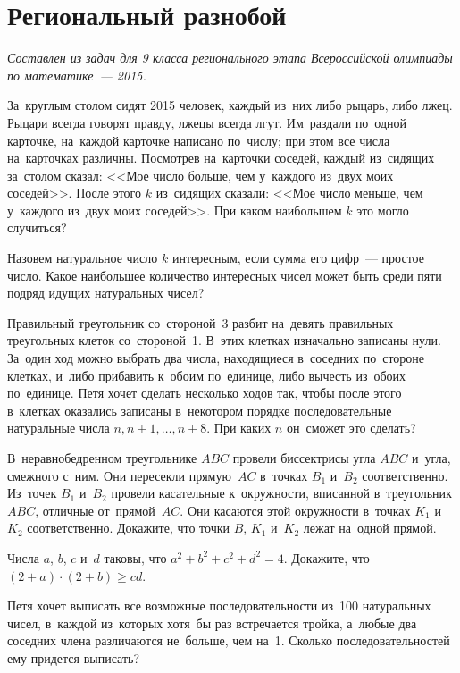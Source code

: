 
\section*{Региональный разнобой}

\emph{Составлен из задач для 9 класса регионального этапа Всероссийской
олимпиады по математике~--- 2015.}

\begin{problems}

\item
За~круглым столом сидят 2015 человек, каждый из~них либо рыцарь, либо лжец.
Рыцари всегда говорят правду, лжецы всегда лгут.
Им~раздали по~одной карточке, на~каждой карточке написано по~числу;
при этом все числа на~карточках различны.
Посмотрев на~карточки соседей, каждый из~сидящих за~столом сказал:
<<Мое число больше, чем у~каждого из~двух моих соседей>>.
После этого $k$ из~сидящих сказали:
<<Мое число меньше, чем у~каждого из~двух моих соседей>>.
При каком наибольшем $k$ это могло случиться?

\item
Назовем натуральное число $k$ интересным, если сумма его цифр~--- простое
число.
Какое наибольшее количество интересных чисел может быть среди пяти подряд
идущих натуральных чисел?

\item
Правильный треугольник со~стороной~3 разбит на~девять правильных треугольных
клеток со~стороной~1.
В~этих клетках изначально записаны нули.
За~один ход можно выбрать два числа, находящиеся в~соседних по~стороне клетках,
и~либо прибавить к~обоим по~единице, либо вычесть из~обоих по~единице.
Петя хочет сделать несколько ходов так, чтобы после этого в~клетках оказались
записаны в~некотором порядке последовательные натуральные числа
$n, n + 1, \ldots, n + 8$.
При каких $n$ он~сможет это сделать?

\item
В~неравнобедренном треугольнике $ABC$ провели биссектрисы угла $ABC$ и~угла,
смежного с~ним.
Они пересекли прямую~$AC$ в~точках $B_1$ и~$B_2$ соответственно.
Из~точек $B_1$ и~$B_2$ провели касательные к~окружности, вписанной
в~треугольник $ABC$, отличные от~прямой~$AC$.
Они касаются этой окружности в~точках $K_1$ и~$K_2$ соответственно.
Докажите, что точки $B$, $K_1$ и~$K_2$ лежат на~одной прямой.

\item
Числа $a$, $b$, $c$ и~$d$ таковы, что $a^2 + b^2 + c^2 + d^2 = 4$.
Докажите, что $(2 + a) \cdot (2 + b) \geq c d$.

\item
Петя хочет выписать все возможные последовательности из~100 натуральных чисел,
в~каждой из~которых хотя~бы раз встречается тройка, а~любые два соседних члена
различаются не~больше, чем на~1.
Сколько последовательностей ему придется выписать?

\end{problems}

